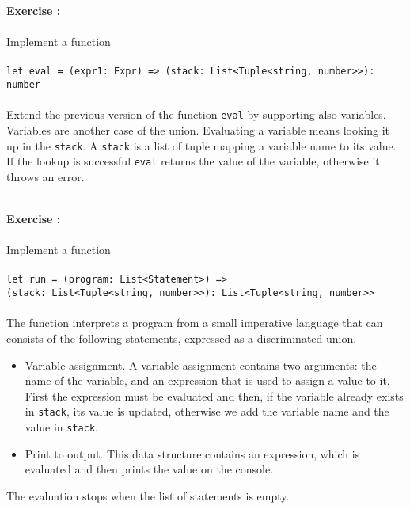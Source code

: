 \documentclass[]{article}
\newcounter{ExerciseCount}
\newcommand{\functionEx}[3]{
  Implement a function\\\\
   \texttt{let #1 = #2}\\\\ #3
}
\newcommand{\exercise}[1]{\noindent \textbf{Exercise \theExerciseCount:}\\\\ #1 \addtocounter{ExerciseCount}{1}
}
\begin{document}
\exercise{
  \functionEx{eval}{(expr1: Expr) => (stack: List<Tuple<string, number>>): number}{
  Extend the previous version of the function \texttt{eval} by supporting also variables. Variables are another case of the union. Evaluating a variable means looking it up in the \texttt{stack}. A \texttt{stack} is a list of tuple mapping a variable name to its value. If the lookup is successful \texttt{eval} returns the value of the variable, otherwise it throws an error.
}}\\

\exercise{
  \functionEx{run}{(program: List<Statement>) =>\\ (stack: List<Tuple<string, number>>): List<Tuple<string, number>>}{
  The function interprets a program from a small imperative language that can consists of the following statements, expressed as a discriminated union.
  
  \begin{itemize}[noitemsep]
  \item Variable assignment. A variable assignment contains two arguments: the name of the variable, and an expression that is used to assign a value to it. First the expression must be evaluated and then, if the variable already exists in \texttt{stack}, its value is updated, otherwise we add the variable name and the value in \texttt{stack}.
  \item Print to output. This data structure contains an expression, which is evaluated and then prints the value on the console.
  \end{itemize}
  
  The evaluation stops when the list of statements is empty.
}}\\
\end{document}

